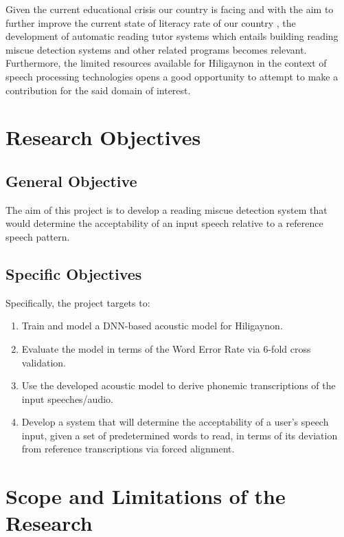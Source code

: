 Given the current educational crisis our country is facing \cite{unicef-2022} and with the aim to further improve the current state of  literacy rate of our country \cite{hernandez-2020}, the development of automatic reading tutor systems which entails building reading miscue detection systems and other related programs becomes relevant. Furthermore, the limited resources available for Hiligaynon in the context of speech processing technologies opens a good opportunity to attempt to make a contribution for the said domain of interest.

\section{Research Objectives}
\label{sec:researchobjectives}

\subsection{General Objective}
\label{sec:generalobjective}

The aim of this project is to develop a reading miscue detection system that would determine the acceptability of an input speech relative to a reference speech pattern.

\subsection{Specific Objectives}
\label{sec:specificobjectives}

Specifically, the project targets to:

\begin{enumerate}
   \item Train and model a DNN-based acoustic model for Hiligaynon.
   \item Evaluate the model in terms of the Word Error Rate via 6-fold cross validation.
   \item Use the developed acoustic model to derive phonemic transcriptions of the input speeches/audio.
   \item Develop a system that will determine the acceptability of a user's speech input, given a set of predetermined words to read, in terms of its deviation from reference transcriptions via forced alignment.
\end{enumerate}

\section{Scope and Limitations of the Research}
\label{sec:scopelimitations}

